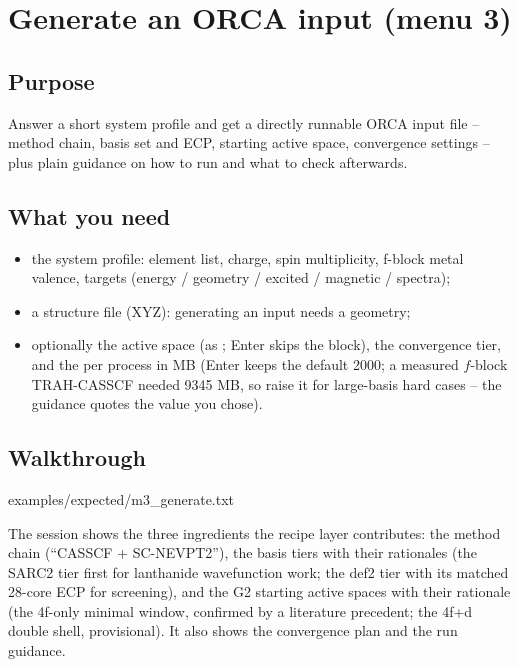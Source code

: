 \chapter{Generate an ORCA input (menu 3)}
\label{ch:menu3}

\section{Purpose}

Answer a short system profile and get a directly runnable ORCA input file --
method chain, basis set and ECP, starting active space, convergence settings --
plus plain guidance on how to run and what to check afterwards.

\section{What you need}

\begin{itemize}
  \item the system profile: element list, charge, spin multiplicity,
    f-block metal valence, targets
    (energy / geometry / excited / magnetic / spectra);
  \item a structure file (XYZ): generating an input needs a geometry;
  \item optionally the active space (as ; Enter
    skips the  block), the convergence tier, and the
     per process in MB (Enter keeps the default 2000; a
    measured $f$-block TRAH-CASSCF needed 9345 MB, so raise it for
    large-basis hard cases -- the guidance quotes the value you chose).
\end{itemize}

\section{Walkthrough}


  {examples/expected/m3_generate.txt}

The session shows the three ingredients the recipe layer contributes: the
method chain (``CASSCF + SC-NEVPT2''), the basis tiers with their rationales
(the SARC2 tier first for lanthanide wavefunction work; the def2 tier with its
matched 28-core ECP for screening), and the G2 starting active spaces with
their rationale (the 4f-only minimal window, confirmed by a literature
precedent; the 4f+d double shell, provisional). It also shows the convergence
plan and the run guidance.

